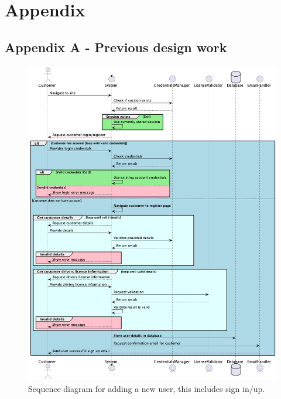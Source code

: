 \section{Appendix}

\subsection{Appendix A - Previous design work}
\label{sec:AppendixA}

  \begin{figure}[H]
    \centering
    \includegraphics[width=12cm]{assets/Sequence1.png}
    \caption{Sequence diagram for adding a new user, this includes sign in/up.}
    \label{fig:newUserSequence}
  \end{figure}

